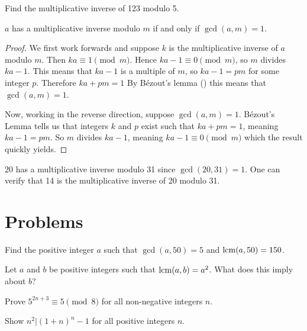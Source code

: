 \begin{exercise}
    Find the multiplicative inverse of 123 modulo 5.
\end{exercise}

\begin{proposition}\label{prop-multiplicative-inverse-exists-iff-coprime}
    $a$ has a multiplicative inverse modulo $m$ if and only if $\gcd(a,m) = 1$.
\end{proposition}
\begin{proof}
    We first work forwards and suppose $k$ is the multiplicative inverse of $a$ modulo $m$. Then $ka \equiv 1 \pmod m$. Hence $ka - 1 \equiv 0 \pmod m$, so $m$ divides $ka - 1$. This means that $ka - 1$ is a multiple of $m$, so $ka - 1 = pm$ for some integer $p$. Therefore $ka + pm = 1$ By B\'{e}zout's lemma () this means that $\gcd(a, m) = 1$.

    Now, working in the reverse direction, suppose $\gcd(a, m) = 1$. B\'{e}zout's Lemma tells us that integers $k$ and $p$ exist such that $ka + pm = 1$, meaning $ka - 1 = pm$. So $m$ divides $ka - 1$, meaning $ka - 1 \equiv 0 \pmod m$ which the result quickly yields.
\end{proof}

\begin{example}
    20 has a multiplicative inverse modulo 31 since $\gcd(20, 31) = 1$. One can verify that 14 is the multiplicative inverse of 20 modulo 31.
\end{example}

\newpage

\section{Problems}
\begin{problem}
    Find the positive integer $a$ such that $\gcd(a, 50) = 5$ and $\mathrm{lcm}(a, 50) = 150$.
\end{problem}

\begin{problem}
    Let $a$ and $b$ be positive integers such that $\mathrm{lcm}(a, b) = a^2$. What does this imply about $b$?
\end{problem}

\begin{problem}
    Prove $5^{2n+3} \equiv 5 \pmod 8$ for all non-negative integers $n$.
\end{problem}

\begin{problem}
    Show $n^2 \vert (1+n)^n - 1$ for all positive integers $n$.
\end{problem}

